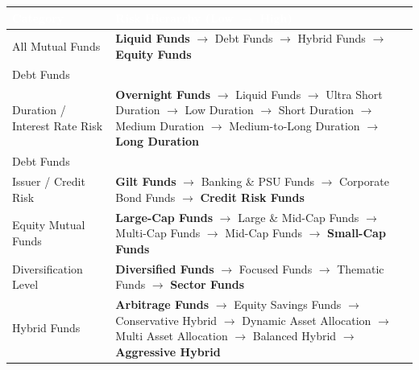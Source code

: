 \documentclass[12pt,a4paper]{article}
\begin{document}
\begin{center}
\begingroup
\small
\renewcommand{\arraystretch}{1.12}
\setlength{\tabcolsep}{5pt}
\begin{tabularx}{\linewidth}{B{3.6cm} Y}
\toprule
{}
\textcolor{white}{\textbf{Category}} &
\textcolor{white}{\textbf{Risk Hierarchy (Low \texorpdfstring{$\longrightarrow$}{to} High)}}\\
\midrule
{}
All Mutual Funds
& \textcolor{ToleranceColor}{\textbf{Liquid Funds}} $\to$ Debt Funds $\to$ Hybrid Funds $\to$ \textcolor{Aggressive}{\textbf{Equity Funds}}\\[5pt]

Debt Funds\\[-1pt]{\normalfont\small Duration / Interest Rate Risk}
& \textcolor{ToleranceColor}{\textbf{Overnight Funds}} $\to$ Liquid Funds $\to$ Ultra Short Duration $\to$ Low Duration $\to$ Short Duration $\to$ Medium Duration $\to$ Medium-to-Long Duration $\to$ \textcolor{Aggressive}{\textbf{Long Duration}}\\[5pt]

Debt Funds\\[-1pt]{\normalfont\small Issuer / Credit Risk}
& \textcolor{ToleranceColor}{\textbf{Gilt Funds}} $\to$ Banking \& PSU Funds $\to$ Corporate Bond Funds $\to$ \textcolor{Aggressive}{\textbf{Credit Risk Funds}}\\[5pt]

Equity Mutual Funds
& \textcolor{ToleranceColor}{\textbf{Large-Cap Funds}} $\to$ Large \& Mid-Cap Funds $\to$ Multi-Cap Funds $\to$ Mid-Cap Funds $\to$ \textcolor{Aggressive}{\textbf{Small-Cap Funds}}\\[5pt]

Diversification Level
& \textcolor{ToleranceColor}{\textbf{Diversified Funds}} $\to$ Focused Funds $\to$ Thematic Funds $\to$ \textcolor{Aggressive}{\textbf{Sector Funds}}\\[5pt]

Hybrid Funds
& \textcolor{ToleranceColor}{\textbf{Arbitrage Funds}} $\to$ Equity Savings Funds $\to$ Conservative Hybrid $\to$ Dynamic Asset Allocation $\to$ Multi Asset Allocation $\to$ Balanced Hybrid $\to$ \textcolor{Aggressive}{\textbf{Aggressive Hybrid}}\\
\bottomrule
\end{tabularx}
\endgroup
\end{center}
\end{document}
